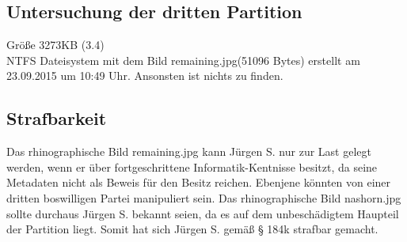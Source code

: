 \subsection{Untersuchung der dritten Partition}
Größe 3273KB (3.4)\\
NTFS Dateisystem mit dem Bild remaining.jpg(51096 Bytes) erstellt am 23.09.2015 um 10:49 Uhr.
Ansonsten ist nichts zu finden.

\subsection{Strafbarkeit}
Das rhinographische Bild remaining.jpg kann Jürgen S. nur zur Last gelegt werden, wenn er über fortgeschrittene Informatik-Kentnisse besitzt, da seine Metadaten nicht als Beweis für den Besitz reichen. Ebenjene könnten von einer dritten boswilligen Partei manipuliert sein. Das rhinographische Bild nashorn.jpg sollte durchaus Jürgen S. bekannt seien, da es auf dem unbeschädigtem Haupteil der Partition liegt. Somit hat sich Jürgen S. gemäß § 184k strafbar gemacht.